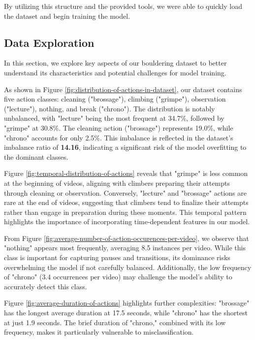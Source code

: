 By utilizing this structure and the provided tools, we were able to quickly load the dataset and begin training the model.

\subsection{Data Exploration}  
In this section, we explore key aspects of our bouldering dataset to better understand its characteristics and potential challenges for model training.



As shown in Figure \ref{fig:distribution-of-actions-in-dataset}, our dataset contains five action classes: cleaning ("brossage"), climbing ("grimpe"), observation ("lecture"), nothing, and break ("chrono"). The distribution is notably unbalanced, with "lecture" being the most frequent at 34.7\%, followed by "grimpe" at 30.8\%. The cleaning action ("brossage") represents 19.0\%, while "chrono" accounts for only 2.5\%. This imbalance is reflected in the dataset's imbalance ratio of \textbf{14.16}, indicating a significant risk of the model overfitting to the dominant classes.

Figure \ref{fig:temporal-distribution-of-actions} reveals that "grimpe" is less common at the beginning of videos, aligning with climbers preparing their attempts through cleaning or observation. Conversely, "lecture" and "brossage" actions are rare at the end of videos, suggesting that climbers tend to finalize their attempts rather than engage in preparation during these moments. This temporal pattern highlights the importance of incorporating time-dependent features in our model.

From Figure \ref{fig:average-number-of-action-occurences-per-video}, we observe that "nothing" appears most frequently, averaging 8.5 instances per video. While this class is important for capturing pauses and transitions, its dominance risks overwhelming the model if not carefully balanced. Additionally, the low frequency of "chrono" (3.4 occurrences per video) may challenge the model's ability to accurately detect this class.

Figure \ref{fig:average-duration-of-actions} highlights further complexities: "brossage" has the longest average duration at 17.5 seconds, while "chrono" has the shortest at just 1.9 seconds. The brief duration of "chrono," combined with its low frequency, makes it particularly vulnerable to misclassification.

